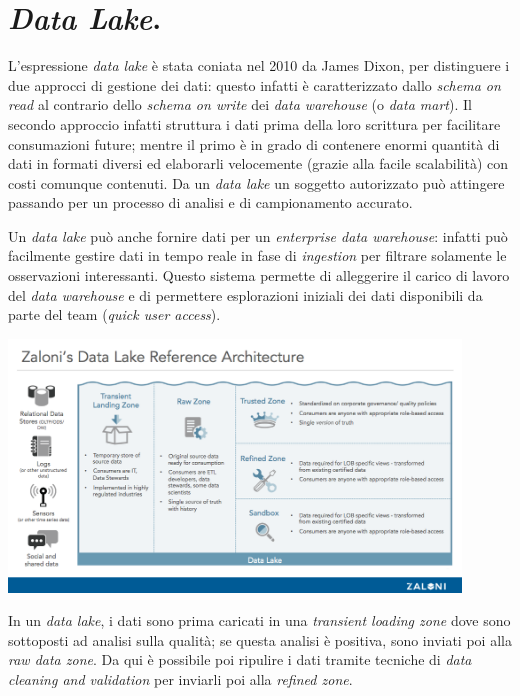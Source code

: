 \documentclass[a4page, 11pt]{article}
\begin{document}
\section{\textit{Data Lake}.}
L'espressione \textit{data lake} è stata coniata nel 2010 da James Dixon, per distinguere i due approcci di gestione dei dati: questo infatti è caratterizzato dallo \textit{schema on read} al contrario dello \textit{schema on write} dei \textit{data warehouse} (o \textit{data mart}).
Il secondo approccio infatti struttura i dati prima della loro scrittura per facilitare consumazioni future; mentre il primo è in grado di contenere enormi quantità di dati in formati diversi ed elaborarli velocemente (grazie alla facile scalabilità) con costi comunque contenuti.
Da un \textit{data lake} un soggetto autorizzato può attingere passando per un processo di analisi e di campionamento accurato.

Un \textit{data lake} può anche fornire dati per un \textit{enterprise data warehouse}: infatti può facilmente gestire dati in tempo reale in fase di \textit{ingestion} per filtrare solamente le osservazioni interessanti.
Questo sistema permette di alleggerire il carico di lavoro del \textit{data warehouse} e di permettere esplorazioni iniziali dei dati disponibili da parte del team (\textit{quick user access}).
\begin{center}
  \includegraphics[width=120mm]{data_lake_arch.png}
\end{center}

In un \textit{data lake}, i dati sono prima caricati in una \textit{transient loading zone} dove sono sottoposti ad analisi sulla qualità; se questa analisi è positiva, sono inviati poi alla \textit{raw data zone}.
Da qui è possibile poi ripulire i dati tramite tecniche di \textit{data cleaning and validation} per inviarli poi alla \textit{refined zone}.
\end{document}
